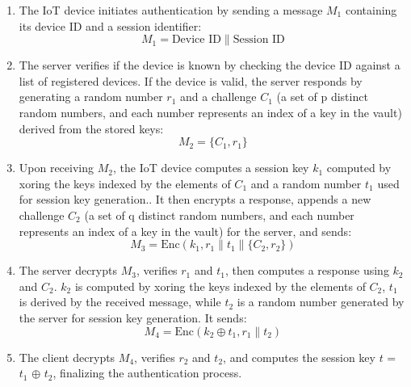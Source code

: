 \documentclass[10pt,twocolumn,letterpaper]{article}
\begin{document}
\begin{enumerate}
    \item The IoT device initiates authentication by sending a message $M_1$ containing its device ID and a session identifier:
          \begin{equation}
              M_1 = \text{Device ID} \parallel \text{Session ID}
          \end{equation}

    \item The server verifies if the device is known by checking the device ID against a list of registered devices. If the device is valid, the server
     responds by generating a random number $r_1$ and a challenge $C_1$ (a set of p distinct random numbers, and each number represents an index of a key in the vault) derived from the stored keys:
          \begin{equation}
              M_2 = \{ C_1, r_1 \}
          \end{equation}

    \item Upon receiving $M_2$, the IoT device computes a session key $k_1$ computed by xoring the keys indexed by the elements of $C_1$ and a random number $t_1$ used for session key generation.. It then encrypts a response,
          appends a new challenge $C_2$ (a set of q distinct random numbers, and each number represents an index of a key in the vault) for the server, and sends:
          \begin{equation}
              M_3 = \text{Enc}(k_1, r_1 \parallel t_1 \parallel \{ C_2, r_2 \})
          \end{equation}

    \item The server decrypts $M_3$, verifies $r_1$ and $t_1$, then computes a response using $k_2$ and $C_2$.
          $k_2$ is computed by xoring the keys indexed by the elements of $C_2$, $t_1$ is derived by the received message,
          while $t_2$ is a random number generated by the server for session key generation.
          It sends:
          \begin{equation}
              M_4 = \text{Enc}(k_2 \oplus t_1, r_1 \parallel t_2)
          \end{equation}

    \item The client decrypts $M_4$, verifies $r_2$ and $t_2$, and computes the session key $t$ = $t_1$ $\oplus$ $t_2$, finalizing the authentication process.
\end{enumerate}
\end{document}

